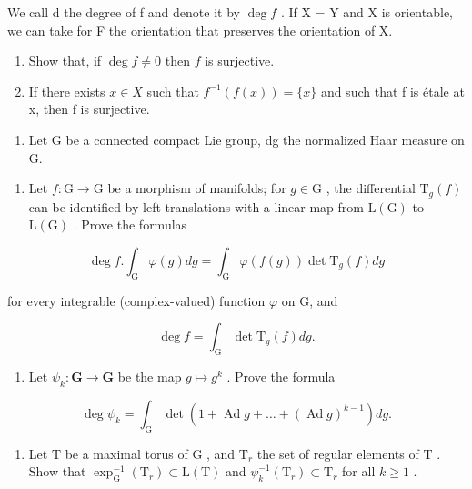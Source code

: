 We call d the degree of f and denote it by \(\deg f\) . If X = Y and X is orientable, we can take for F the orientation that preserves the orientation of X.

\begin{enumerate}
\def\labelenumi{\alph{enumi})}
\setcounter{enumi}{2}
\item
  Show that, if \(\deg f \neq 0\) then \(f\) is surjective.
\item
  If there exists \(x \in X\) such that \(f^{-1}(f(x)) = \{x\}\) and such that f is étale at x, then f is surjective.
\end{enumerate}

\begin{enumerate}
\def\labelenumi{\arabic{enumi})}
\setcounter{enumi}{7}
\tightlist
\item
  Let G be a connected compact Lie group, dg the normalized Haar measure on G.
\end{enumerate}

\begin{enumerate}
\def\labelenumi{\alph{enumi})}
\tightlist
\item
  Let \(f: \mathrm{G} \to \mathrm{G}\) be a morphism of manifolds; for \(g \in \mathrm{G}\) , the differential \(\mathrm{T}_g(f)\) can be identified by left translations with a linear map from \(\mathrm{L}(\mathrm{G})\) to \(\mathrm{L}(\mathrm{G})\) . Prove the formulas
\end{enumerate}

\[
\deg f. \int_ {\mathrm{G}} \varphi (g) d g = \int_ {\mathrm{G}} \varphi (f (g)) \det \mathrm{T} _ {g} (f) d g
\]

for every integrable (complex-valued) function \(\varphi\) on G, and

\[
\deg f = \int_ {\mathrm{G}} \det \mathrm{T} _ {g} (f) d g.
\]

\begin{enumerate}
\def\labelenumi{\alph{enumi})}
\setcounter{enumi}{1}
\tightlist
\item
  Let \(\psi_k: \mathbf{G} \to \mathbf{G}\) be the map \(g \mapsto g^k\) . Prove the formula
\end{enumerate}

\[
\deg \psi_ {k} = \int_ {\mathrm{G}} \det (1 + \operatorname{Ad} g + \dots + (\operatorname{Ad} g) ^ {k - 1}) d g.
\]

\begin{enumerate}
\def\labelenumi{\alph{enumi})}
\setcounter{enumi}{2}
\tightlist
\item
  Let \(\mathrm{T}\) be a maximal torus of \(\mathrm{G}\) , and \(\mathrm{T}_r\) the set of regular elements of \(\mathrm{T}\) . Show that \(\exp_{\mathrm{G}}^{-1}(\mathrm{T}_r) \subset \mathrm{L}(\mathrm{T})\) and \(\psi_k^{-1}(\mathrm{T}_r) \subset \mathrm{T}_r\) for all \(k \geq 1\) .
\end{enumerate}

